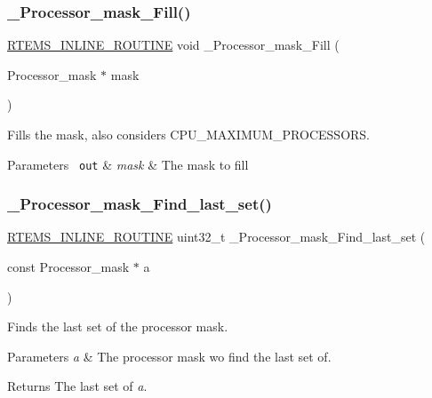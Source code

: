 \subsubsection{\texorpdfstring{\_Processor\_mask\_Fill()}{\_Processor\_mask\_Fill()}}
{\footnotesize\ttfamily \mbox{\hyperlink{group__RTEMSScoreBaseDefs_gac216239df231d5dbd15e3520b0b9313f}{R\+T\+E\+M\+S\+\_\+\+I\+N\+L\+I\+N\+E\+\_\+\+R\+O\+U\+T\+I\+NE}} void \+\_\+\+Processor\+\_\+mask\+\_\+\+Fill (\begin{DoxyParamCaption}\item[{Processor\+\_\+mask $\ast$}]{mask }\end{DoxyParamCaption})}



Fills the mask, also considers C\+P\+U\+\_\+\+M\+A\+X\+I\+M\+U\+M\+\_\+\+P\+R\+O\+C\+E\+S\+S\+O\+RS. 


\begin{DoxyParams}[1]{Parameters}
\mbox{\texttt{ out}}  & {\em mask} & The mask to fill \\
\hline
\end{DoxyParams}
\mbox{\label{group__RTEMSScoreProcessorMask_gaed9f2ed311a025c27a2a70ca0eef53a9}} 
\subsubsection{\texorpdfstring{\_Processor\_mask\_Find\_last\_set()}{\_Processor\_mask\_Find\_last\_set()}}
{\footnotesize\ttfamily \mbox{\hyperlink{group__RTEMSScoreBaseDefs_gac216239df231d5dbd15e3520b0b9313f}{R\+T\+E\+M\+S\+\_\+\+I\+N\+L\+I\+N\+E\+\_\+\+R\+O\+U\+T\+I\+NE}} uint32\+\_\+t \+\_\+\+Processor\+\_\+mask\+\_\+\+Find\+\_\+last\+\_\+set (\begin{DoxyParamCaption}\item[{const Processor\+\_\+mask $\ast$}]{a }\end{DoxyParamCaption})}



Finds the last set of the processor mask. 


\begin{DoxyParams}{Parameters}
{\em a} & The processor mask wo find the last set of.\\
\hline
\end{DoxyParams}
\begin{DoxyReturn}{Returns}
The last set of {\itshape a}. 
\end{DoxyReturn}
\mbox{\label{group__RTEMSScoreProcessorMask_gafe442b4177fe941ca996d6888e88712b}} 
